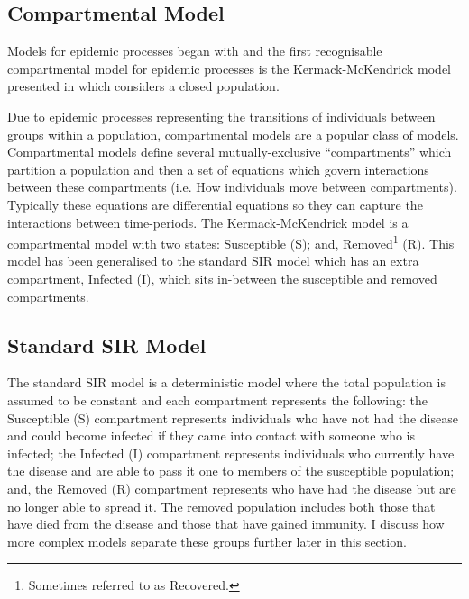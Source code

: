 \documentclass[11pt,a4paper]{article}
\theoremstyle{break}
\begin{document}
\subsection{Compartmental Model}

  \par Models for epidemic processes began with \cite[]{application_of_the_theory_of_probabilities_to_the_study_of_a_prior_pathometry_part_i,application_of_the_theory_of_probabilities_to_the_study_of_a_prior_pathometry_part_ii} and the first recognisable compartmental model for epidemic processes is the Kermack-McKendrick model presented in \cite[]{contribution_to_the_mathematical_theory_of_epidemics} which considers a closed population.

  \par Due to epidemic processes representing the transitions of individuals between groups within a population, compartmental models are a popular class of models. Compartmental models define several mutually-exclusive ``compartments'' which partition a population and then a set of equations which govern interactions between these compartments (i.e. How individuals move between compartments). Typically these equations are differential equations so they can capture the interactions between time-periods. The Kermack-McKendrick model is a compartmental model with two states: Susceptible (S); and, Removed\footnote{Sometimes referred to as Recovered.} (R). This model has been generalised to the standard SIR model which has an extra compartment, Infected (I), which sits in-between the susceptible and removed compartments.

\subsection*{Standard SIR Model}

  \par The standard SIR model \cite[]{mathematical_modelling_and_prediction_in_infectious_disease_epidemiology} is a deterministic model where the total population is assumed to be constant and each compartment represents the following: the Susceptible (S) compartment represents individuals who have not had the disease and could become infected if they came into contact with someone who is infected; the Infected (I) compartment represents individuals who currently have the disease and are able to pass it one to members of the susceptible population; and, the Removed (R) compartment represents who have had the disease but are no longer able to spread it. The removed population includes both those that have died from the disease and those that have gained immunity. I discuss how more complex models separate these groups further later in this section.
\end{document}
